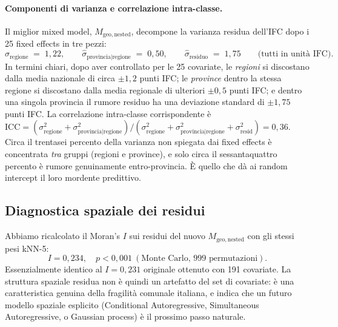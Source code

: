 \documentclass[11pt,a4paper]{article}
\begin{document}
\paragraph{Componenti di varianza e correlazione intra-classe.}
Il miglior mixed model, $M_{\mathrm{geo,nested}}$, decompone la
varianza residua dell'IFC dopo i 25 fixed effects in tre pezzi:
\begin{equation}
  \widehat\sigma_{\text{regione}} \;=\; 1{,}22, \qquad
  \widehat\sigma_{\text{provincia}|\text{regione}} \;=\; 0{,}50, \qquad
  \widehat\sigma_{\text{residuo}} \;=\; 1{,}75
  \qquad \text{(tutti in unit\`a IFC).}
  \label{eq:varcomp}
\end{equation}
In termini chiari, dopo aver controllato per le 25 covariate, le
\emph{regioni} si discostano dalla media nazionale di circa
$\pm 1{,}2$ punti IFC; le \emph{province} dentro la stessa regione
si discostano dalla media regionale di ulteriori $\pm 0{,}5$ punti
IFC; e dentro una singola provincia il rumore residuo ha una
deviazione standard di $\pm 1{,}75$ punti IFC. La correlazione
intra-classe corrispondente \`e
$\mathrm{ICC} = (\sigma^2_{\text{regione}} +
\sigma^2_{\text{provincia}|\text{regione}}) /
(\sigma^2_{\text{regione}} +
\sigma^2_{\text{provincia}|\text{regione}} +
\sigma^2_{\text{resid}}) = 0{,}36$. Circa il trentasei percento
della varianza non spiegata dai fixed effects \`e concentrata
\emph{tra} gruppi (regioni e province), e solo circa il sessantaquattro
percento \`e rumore genuinamente entro-provincia. \`E quello che d\`a
ai random intercept il loro mordente predittivo.

\subsection{Diagnostica spaziale dei residui}

Abbiamo ricalcolato il Moran's $I$ sui residui del nuovo
$M_{\mathrm{geo,nested}}$ con gli stessi pesi kNN-5:
\begin{equation*}
  I = 0{,}234, \quad p < 0{,}001\ (\text{Monte Carlo, 999 permutazioni}).
\end{equation*}
Essenzialmente identico al $I = 0{,}231$ originale ottenuto con 191
covariate. La struttura spaziale residua non \`e quindi un artefatto
del set di covariate: \`e una caratteristica genuina della
fragilit\`a comunale italiana, e indica che un futuro modello
spaziale esplicito (Conditional Autoregressive, Simultaneous
Autoregressive, o Gaussian process) \`e il prossimo passo naturale.
\end{document}
